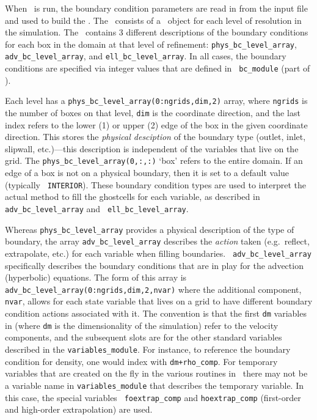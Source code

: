 \label{sec:arch:bcs}

When \maestro\ is run, the boundary condition parameters are read in
from the input file and used to build the \bctower.  The
\bctower\ consists of a \bclevel\ object for each level of resolution
in the simulation.  The \bclevel\ contains 3 different descriptions of
the boundary conditions for each box in the domain at that level of
refinement: {\tt phys\_bc\_level\_array}, {\tt adv\_bc\_level\_array},
and {\tt ell\_bc\_level\_array}.  In all cases, the boundary
conditions are specified via integer values that are defined in {\tt
  bc\_module} (part of \boxlib).

Each level has a {\tt phys\_bc\_level\_array(0:ngrids,dim,2)} array,
where {\tt ngrids} is the number of boxes on that level, {\tt dim} is
the coordinate direction, and the last index refers to the lower (1)
or upper (2) edge of the box in the given coordinate direction.  This
stores the {\em physical desciption} of the boundary type (outlet, inlet,
slipwall, etc.)---this description is independent of the variables
that live on the grid.  The {\tt phys\_bc\_level\_array(0,:,:)} `box'
refers to the entire domain.  If an edge of a box is not on a physical
boundary, then it is set to a default value (typically {\tt
  INTERIOR}).  These boundary condition types are used to interpret
the actual method to fill the ghostcells for each variable, as
described in {\tt adv\_bc\_level\_array} and {\tt
  ell\_bc\_level\_array}.


Whereas {\tt phys\_bc\_level\_array} provides a physical description
of the type of boundary, the array {\tt adv\_bc\_level\_array}
describes the {\em action} taken (e.g.\ reflect, extrapolate, etc.)
for each variable when filling boundaries.  {\tt
  adv\_bc\_level\_array} specifically describes the boundary
conditions that are in play for the advection (hyperbolic) equations.
The form of this array is {\tt
  adv\_bc\_level\_array(0:ngrids,dim,2,nvar)} where the additional
component, {\tt nvar}, allows for each state variable that lives on a
grid to have different boundary condition actions associated with it.
The convention is that the first {\tt dm} variables in \bclevel (where {\tt dm} is
the dimensionality of the simulation) refer to the
velocity components, and the subsequent slots are for the other
standard variables described in the {\tt variables\_module}.  For
instance, to reference the boundary condition for density, one would
index with {\tt dm+rho\_comp}.  For temporary variables that are
created on the fly in the various routines in \maestro\ there may not
be a variable name in {\tt variables\_module} that describes the
temporary variable.  In this case, the special variables {\tt
  foextrap\_comp} and {\tt hoextrap\_comp} (first-order and high-order
extrapolation) are used.

